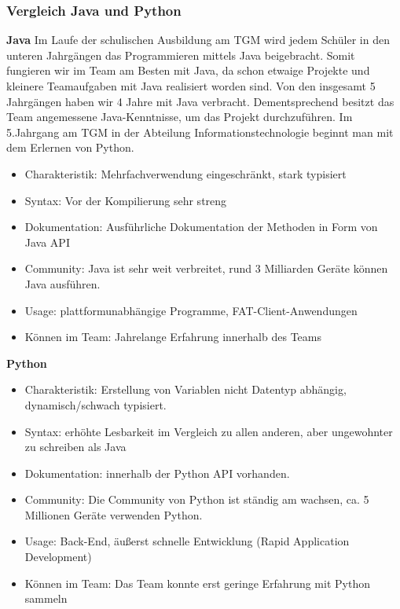 \clearpage
\subsubsection{Vergleich Java und Python}
\textbf{Java\newline}
Im Laufe der schulischen Ausbildung am TGM wird jedem Schüler in den unteren Jahrgängen das Programmieren mittels Java
beigebracht. Somit fungieren wir im Team am Besten mit Java, da schon etwaige Projekte und kleinere Teamaufgaben mit Java
realisiert worden sind. Von den insgesamt 5 Jahrgängen haben wir 4 Jahre mit Java verbracht. Dementsprechend besitzt das Team
angemessene Java-Kenntnisse, um das Projekt durchzuführen. Im 5.Jahrgang am TGM in der Abteilung Informationstechnologie beginnt man mit dem Erlernen von Python.
\begin{itemize}
	\item Charakteristik: Mehrfachverwendung eingeschränkt, stark typisiert
	\item Syntax: Vor der Kompilierung sehr streng
	\item Dokumentation: Ausführliche Dokumentation der Methoden in Form von Java API
	\item Community: Java ist sehr weit verbreitet, rund 3 Milliarden Geräte können Java ausführen.
	\item Usage: plattformunabhängige Programme, FAT-Client-Anwendungen
	\item Können im Team: Jahrelange Erfahrung innerhalb des Teams
\end{itemize}

\textbf{Python\newline}
\begin{itemize}
	\item Charakteristik: Erstellung von Variablen nicht Datentyp abhängig, dynamisch/schwach typisiert.
	\item Syntax: erhöhte Lesbarkeit im Vergleich zu allen anderen, aber ungewohnter zu schreiben als Java
	\item Dokumentation: innerhalb der Python API vorhanden.
	\item Community: Die Community von Python ist ständig am wachsen, ca. 5 Millionen Geräte verwenden Python.
	\item Usage: Back-End, äußerst schnelle Entwicklung (Rapid Application Development)
	\item Können im Team: Das Team konnte erst geringe Erfahrung mit Python sammeln
\end{itemize}

